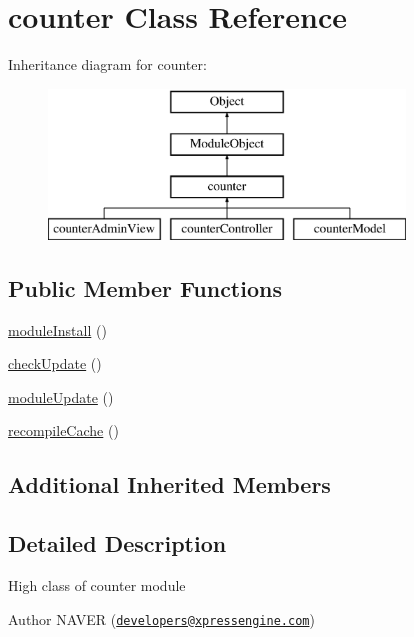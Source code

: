 \hypertarget{classcounter}{\section{counter Class Reference}
\label{classcounter}
}
Inheritance diagram for counter\+:\begin{figure}[H]
\begin{center}
\leavevmode
\includegraphics[height=4.000000cm]{classcounter}
\end{center}
\end{figure}
\subsection*{Public Member Functions}
\begin{DoxyCompactItemize}
\item 
\hyperlink{classcounter_a05510fe21e12390a3cdee668b42cab5b}{module\+Install} ()
\item 
\hyperlink{classcounter_a41683d96129e79d63ce63ccde0efa2f0}{check\+Update} ()
\item 
\hyperlink{classcounter_a7c2e176fb177033a303aca925cddb046}{module\+Update} ()
\item 
\hyperlink{classcounter_a44bf39e02c7cb7c4a3c3000f9b8fba27}{recompile\+Cache} ()
\end{DoxyCompactItemize}
\subsection*{Additional Inherited Members}


\subsection{Detailed Description}
High class of counter module

\begin{DoxyAuthor}{Author}
N\+A\+V\+E\+R (\href{mailto:developers@xpressengine.com}{\tt developers@xpressengine.\+com}) 
\end{DoxyAuthor}


